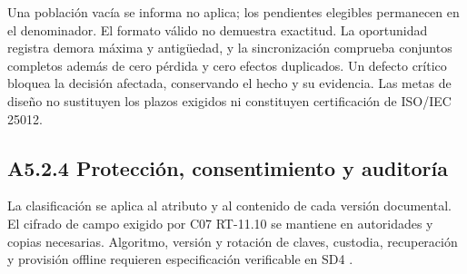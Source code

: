 Una población vacía se informa no aplica; los pendientes elegibles permanecen en el denominador. El formato válido no demuestra exactitud. La oportunidad registra demora máxima y antigüedad, y la sincronización comprueba conjuntos completos además de cero pérdida y cero efectos duplicados. Un defecto crítico bloquea la decisión afectada, conservando el hecho y su evidencia. Las metas de diseño no sustituyen los plazos exigidos ni constituyen certificación de ISO/IEC 25012.

\subsection*{A5.2.4 Protección, consentimiento y auditoría}

La clasificación se aplica al atributo y al contenido de cada versión documental. El cifrado de campo exigido por C07 RT-11.10 se mantiene en autoridades y copias necesarias. Algoritmo, versión y rotación de claves, custodia, recuperación y provisión offline requieren especificación verificable en SD4 \parencites[RT-11.10 y RT-16.09]{pucv-caso07}[DA-16]{synaptix-sd4}.


